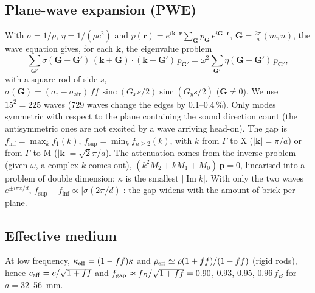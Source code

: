 \documentclass[9pt,a4paper,twocolumn]{extarticle}
\begin{document}
\subsection*{Plane-wave expansion (PWE)}
With $\sigma = 1/\rho$, $\eta = 1/(\rho c^2)$ and $p(\mathbf r) = e^{i\mathbf k\cdot\mathbf r}\sum_{\mathbf G} p_{\mathbf G}\, e^{i\mathbf G\cdot\mathbf r}$, $\mathbf G = \tfrac{2\pi}{a}(m,n)$, the wave equation gives, for each $\mathbf k$, the eigenvalue problem
\begin{equation*}
  \sum_{\mathbf G'}\sigma(\mathbf G-\mathbf G')\,(\mathbf k+\mathbf G)\cdot(\mathbf k+\mathbf G')\,p_{\mathbf G'}
  = \omega^2\sum_{\mathbf G'}\eta(\mathbf G-\mathbf G')\,p_{\mathbf G'},
\end{equation*}
with a square rod of side $s$, $\sigma(\mathbf G) = (\sigma_\text{t}-\sigma_\text{air})\,f\!f\,\operatorname{sinc}(G_xs/2)\operatorname{sinc}(G_ys/2)$ ($\mathbf G \neq 0$). We use $15^2 = 225$ waves (729 waves change the edges by 0.1--0.4\,\%). Only modes symmetric with respect to the plane containing the sound direction count (the antisymmetric ones are not excited by a wave arriving head-on). The gap is $f_\text{inf} = \max_k f_1(k)$, $f_\text{sup} = \min_k f_{n\ge2}(k)$, with $k$ from $\Gamma$ to X ($|\mathbf k| = \pi/a$) or from $\Gamma$ to M ($|\mathbf k| = \sqrt{2}\pi/a$). The attenuation comes from the inverse problem (given $\omega$, a complex $k$ comes out), $(k^2 M_2 + k M_1 + M_0)\,\mathbf p = 0$, linearised into a problem of double dimension; $\kappa$ is the smallest $|\operatorname{Im} k|$. With only the two waves $e^{\pm i\pi x/d}$, $f_\text{sup} - f_\text{inf} \propto |\sigma(2\pi/d)|$: the gap widens with the amount of brick per plane.

\subsection*{Effective medium}
At low frequency, $\kappa_{\rm eff}=(1-ff)\kappa$ and $\rho_{\rm eff}\simeq\rho(1+ff)/(1-ff)$ (rigid rods), hence $c_{\rm eff}=c/\sqrt{1+ff}$ and $f_{\rm gap}\approx f_B/\sqrt{1+ff}=0.90$, 0.93, 0.95, $0.96\,f_B$ for $a=32$--\SI{56}{\milli\meter}.
\end{document}
